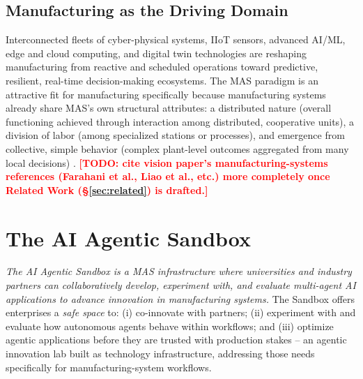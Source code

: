 \documentclass[10pt,conference]{IEEEtran}
\newcommand{\todo}[1]{\textcolor{red}{\textbf{[TODO: #1]}}}
\begin{document}
\subsection{Manufacturing as the Driving Domain}
Interconnected fleets of cyber-physical systems, IIoT sensors, advanced
AI/ML, edge and cloud computing, and digital twin technologies are reshaping
manufacturing from reactive and scheduled operations toward predictive,
resilient, real-time decision-making ecosystems. The MAS paradigm is an
attractive fit for manufacturing specifically because manufacturing systems
already share MAS's own structural attributes: a distributed nature
(overall functioning achieved through interaction among distributed,
cooperative units), a division of labor (among specialized stations or
processes), and emergence from collective, simple behavior (complex
plant-level outcomes aggregated from many local decisions)
\cite{Barbosa2010,Leitao2012,Bussmann2004}. \todo{cite vision paper's
manufacturing-systems references (Farahani et al., Liao et al., etc.) more
completely once Related Work (\S\ref{sec:related}) is drafted.}

\section{The AI Agentic Sandbox}
\label{sec:sandbox}
\emph{The AI Agentic Sandbox is a MAS infrastructure where universities and
industry partners can collaboratively develop, experiment with, and evaluate
multi-agent AI applications to advance innovation in manufacturing systems.}
The Sandbox offers enterprises a \emph{safe space} to: (i) co-innovate with
partners; (ii) experiment with and evaluate how autonomous agents behave
within workflows; and (iii) optimize agentic applications before they are
trusted with production stakes -- an agentic innovation lab built as
technology infrastructure, addressing those needs specifically for
manufacturing-system workflows.
\end{document}
